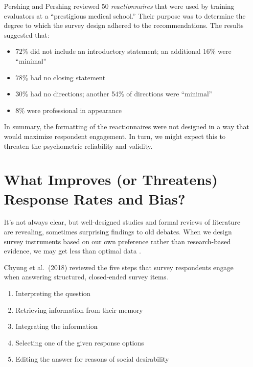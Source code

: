 \documentclass[
  english,
]{book}
\providecommand{\tightlist}{%
  \setlength{\itemsep}{0pt}\setlength{\parskip}{0pt}}
\begin{document}
Pershing and Pershing \citeyearpar{pershing_ineffective_2001} reviewed 50 \emph{reactionnaires} that were used by training evaluators at a ``prestigious medical school.'' Their purpose was to determine the degree to which the survey design adhered to the recommendations. The results suggested that:

\begin{itemize}
\tightlist
\item
  72\% did not include an introductory statement; an additional 16\% were ``minimal''
\item
  78\% had no closing statement
\item
  30\% had no directions; another 54\% of directions were ``minimal''
\item
  8\% were professional in appearance
\end{itemize}

In summary, the formatting of the reactionnaires were not designed in a way that would maximize respondent engagement. In turn, we might expect this to threaten the psychometric reliability and validity.

\hypertarget{what-improves-or-threatens-response-rates-and-bias}{%
\section{What Improves (or Threatens) Response Rates and Bias?}\label{what-improves-or-threatens-response-rates-and-bias}}

It's not always clear, but well-designed studies and formal reviews of literature are revealing, sometimes surprising findings to old debates. When we design survey instruments based on our own preference rather than research-based evidence, we may get less than optimal data \citep{chyung_evidence-based_2018}.

Chyung et al.~(2018) reviewed the five steps \citep{schwarz_asking_2001} that survey respondents engage when answering structured, closed-ended survey items.

\begin{enumerate}
\def\labelenumi{\arabic{enumi}.}
\tightlist
\item
  Interpreting the question
\item
  Retrieving information from their memory
\item
  Integrating the information
\item
  Selecting one of the given response options
\item
  Editing the answer for reasons of social desirability
\end{enumerate}
\end{document}
